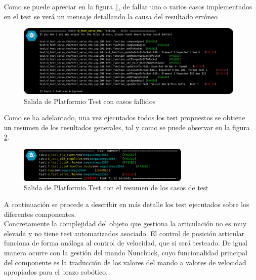     Como se puede apreciar en la figura \ref{fig:SW:test:error_output}, de fallar uno o varios casos implementados en el test se verá un mensaje detallando la causa del resultado erróneo

    \begin{figure}[H]
        \centering
        \includegraphics[width=1\textwidth]{figuras/Imagenes_SW/test/SWTest_3.jpg}
        \caption{Salida de Platformio Test con casos fallidos}
        \label{fig:SW:test:error_output}
    \end{figure}

    Como se ha adelantado, una vez ejecutados todos los test propuestos se obtiene un resumen de los resultados generales, tal y como se puede observar en la figura \ref{fig:SW:test:sum_output}.

    \begin{figure}[H]
        \centering
        \includegraphics[width=0.75\textwidth]{figuras/Imagenes_SW/test/SWTest_6.jpg}
        \caption{Salida de Platformio Test con el resumen de los casos de test}
        \label{fig:SW:test:sum_output}
    \end{figure}

    A continuación se procede a describir en más detalle los test ejecutados sobre los diferentes componentes. 
    \\
    
    Concretamente la complejidad del objeto que gestiona la articulación no es muy elevada y no tiene test automatizados asociado. El control de posición articular funciona de forma análoga al control de velocidad, que si será testeado. De igual manera ocurre con la gestión del mando Nunchuck, cuyo funcionalidad principal del componente es la traducción de los valores del mando a valores de velocidad apropiados para el brazo robótico.
    \\
    
